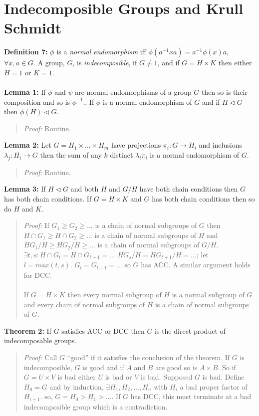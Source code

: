 \section {Indecomposible Groups and Krull Schmidt}
{\bf Definition 7:}
$\phi$ is a \emph{normal endomorphism} iff
$\phi(a^{-1}xa)=
a^{-1} \phi(x)a$, $\forall x,a \in G$.
A group, $G$, is \emph{indecomposible}, if $G \ne 1$, and if $G = H \times K$ then either
$H = 1$ or $K = 1$.
\\
\\
{\bf Lemma 1:} 
If $\phi$ and $\psi$ are normal endomorphisms of a group $G$ then so is their composition
and so is $\phi^{-1}$..
If $\phi$ is a normal endomorphism of $G$ and if $H \lhd G$ then $\phi(H) \lhd G$.
\begin{quote}
\emph{Proof:}  Routine.
\end{quote}
{\bf Lemma 2:}  Let $G = H_1 \times \ldots \times H_m$ have projections $\pi_i : G \rightarrow H_i$
and inclusions $\lambda_j : H_i \rightarrow G$ then the sum of any $k$ distinct $\lambda_i \pi_i$
is a normal endomorphism of $G$.
\begin{quote}
\emph{Proof:}  Routine.
\end{quote}
{\bf Lemma 3:} 
If $H \lhd G$ and both $H$ and $G/H$ have both chain conditions then $G$ has both chain conditions.
If $G= H \times K$ and $G$ has both chain conditions then so do $H$ and $K$.
\begin{quote}
\emph{Proof:}  
If 
$G_1 \ge G_2 \ge \ldots$ is a chain of normal subgroups of $G$ then
$H \cap G_1 \ge H \cap G_2 \ge \ldots$ 
is a chain of normal subgroups of $H$ and
$HG_1 /H \ge HG_2 /H \ge \ldots$ 
is a chain of normal subgroups of $G/H$.  
$\exists t,s: H \cap G_t= H \cap G_{t+1} = \ldots$
$HG_s /H= HG_{t+1} /H = \ldots$; let $l= max(t,s)$.  $G_l=G_{l+1} = \ldots$ so
$G$ has ACC.  A similar argument holds for DCC.\\
\\
If $G = H \times K$ then every normal subgroup of $H$ is a normal subgroup of $G$ and
every chain of normal subgroups  of $H$ is a chain of normal subgroups of $G$.
\end{quote}
{\bf Theorem 2:} 
If $G$ satisfies ACC or DCC then $G$ is the direct product of indecomposable groups.
\begin{quote}
\emph{Proof:}  
Call $G$ ``good'' if it satisfies the conclusion of the theorem.  If $G$ is indecomposible,
$G$ is good and if $A$ and $B$ are good so is $A \times B$.  So if $G= U \times V$ is bad
either $U$ is bad or $V$ is bad.  Supposed $G$ is bad.  Define $H_0=G$ and by induction,
$\exists H_1 , H_2 , \ldots , H_n$ with $H_i$ a bad proper factor of $H_{i+1}$.
so, $G=H_0 > H_1 > \ldots$.  If $G$ has DCC, this must terminate at a bad indecomposible group
which is a contradiction.
\end{quote}
